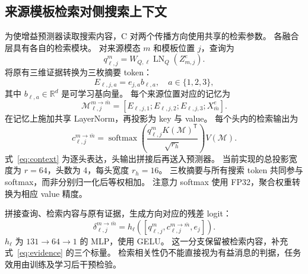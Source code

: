 \documentclass[journal]{IEEEtran}
\newcommand{\softmax}{\operatorname{softmax}}
\newcommand{\LN}{\operatorname{LN}}
\begin{document}
\subsection{来源模板检索对侧搜索上下文}
为使增益预测器读取搜索内容，C 对两个传播方向使用共享的检索参数。
各融合层具有各自的检索模块。
对来源模态 $m$ 和模板位置 $j$，查询为
\begin{equation}
 q_{\ell,j}^{m}=W_{Q,\ell}\LN_Q(Z_{m,j}^{e}).
\end{equation}
将原有三维证据转换为三枚摘要 token：
\begin{equation}
 E_{\ell,j,a}=e_{j,a}b_{\ell,a},\quad a\in\{1,2,3\},
\end{equation}
其中 $b_{\ell,a}\in\mathbb{R}^{d}$ 是可学习基向量。
每个来源位置对应的记忆为
\begin{equation}
 \mathcal M_{\ell,j}^{m\to\bar m}
 =[E_{\ell,j,1};E_{\ell,j,2};E_{\ell,j,3};X_{\bar m}^{e}].
 \label{eq:memory}
\end{equation}
在记忆上施加共享 LayerNorm，再投影为 key 与 value。
每个头内的检索输出为
\begin{equation}
 c_{\ell,j}^{m\to\bar m}
 =\softmax\!\left(\frac{q_{\ell,j}^{m}K(\mathcal M)^{\mathsf T}}{\sqrt{r_h}}\right)V(\mathcal M).
 \label{eq:context}
\end{equation}
式~\eqref{eq:context} 为逐头表达，头输出拼接后再送入预测器。
当前实现的总投影宽度为 $r=64$，头数为 4，每头宽度 $r_h=16$。
三枚摘要与所有搜索 token 共同参与 softmax，而非分别归一化后等权相加。
注意力 softmax 使用 FP32，聚合权重转换为相应 value 精度。

拼接查询、检索内容与原有证据，生成方向对应的残差 logit：
\begin{equation}
 \delta_{\ell,j}^{m\to\bar m}
 =h_\ell([q_{\ell,j}^{m},c_{\ell,j}^{m\to\bar m},e_j]).
\end{equation}
$h_\ell$ 为 $131\to64\to1$ 的 MLP，使用 GELU。
这一分支保留被检索内容，补充式~\eqref{eq:evidence} 的三个标量。
检索相关性仍不能直接视为有益消息的判据，任务效用由训练及学习后干预检验。
\end{document}
